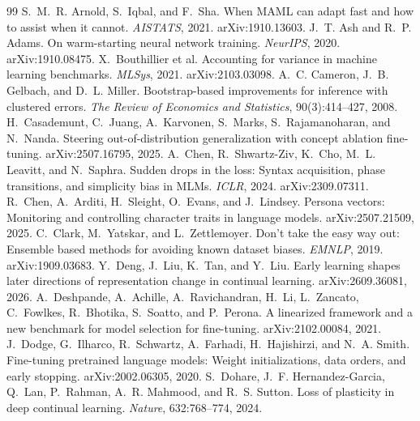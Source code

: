\documentclass[11pt]{article}
\begin{document}

\begin{thebibliography}{99}
 S.~M.~R. Arnold, S.~Iqbal, and F.~Sha. When MAML can adapt fast and how to assist when it cannot. \emph{AISTATS}, 2021. arXiv:1910.13603.
 J.~T. Ash and R.~P. Adams. On warm-starting neural network training. \emph{NeurIPS}, 2020. arXiv:1910.08475.
 X.~Bouthillier et al. Accounting for variance in machine learning benchmarks. \emph{MLSys}, 2021. arXiv:2103.03098.
 A.~C. Cameron, J.~B. Gelbach, and D.~L. Miller. Bootstrap-based improvements for inference with clustered errors. \emph{The Review of Economics and Statistics}, 90(3):414--427, 2008.
 H.~Casademunt, C.~Juang, A.~Karvonen, S.~Marks, S.~Rajamanoharan, and N.~Nanda. Steering out-of-distribution generalization with concept ablation fine-tuning. arXiv:2507.16795, 2025.
 A.~Chen, R.~Shwartz-Ziv, K.~Cho, M.~L. Leavitt, and N.~Saphra. Sudden drops in the loss: Syntax acquisition, phase transitions, and simplicity bias in MLMs. \emph{ICLR}, 2024. arXiv:2309.07311.
 R.~Chen, A.~Arditi, H.~Sleight, O.~Evans, and J.~Lindsey. Persona vectors: Monitoring and controlling character traits in language models. arXiv:2507.21509, 2025.
 C.~Clark, M.~Yatskar, and L.~Zettlemoyer. Don't take the easy way out: Ensemble based methods for avoiding known dataset biases. \emph{EMNLP}, 2019. arXiv:1909.03683.
 Y.~Deng, J.~Liu, K.~Tan, and Y.~Liu. Early learning shapes later directions of representation change in continual learning. arXiv:2609.36081, 2026.
 A.~Deshpande, A.~Achille, A.~Ravichandran, H.~Li, L.~Zancato, C.~Fowlkes, R.~Bhotika, S.~Soatto, and P.~Perona. A linearized framework and a new benchmark for model selection for fine-tuning. arXiv:2102.00084, 2021.
 J.~Dodge, G.~Ilharco, R.~Schwartz, A.~Farhadi, H.~Hajishirzi, and N.~A. Smith. Fine-tuning pretrained language models: Weight initializations, data orders, and early stopping. arXiv:2002.06305, 2020.
 S.~Dohare, J.~F. Hernandez-Garcia, Q.~Lan, P.~Rahman, A.~R. Mahmood, and R.~S. Sutton. Loss of plasticity in deep continual learning. \emph{Nature}, 632:768--774, 2024.

\end{thebibliography}
\end{document}

